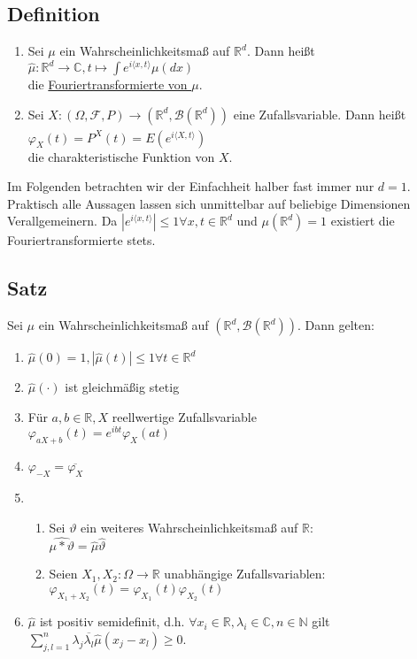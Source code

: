 \documentclass[german,10pt,oneside, fleqn, a4paper]{article}
\newcommand {\R}	{\mathbb{R}}
\newcommand {\N}	{\mathbb{N}}
\newcommand {\C}	{\mathbb{C}}
\newcommand{\ra}{\rightarrow}
\newcommand{\sm}[2][\infty]{\sum\limits_{#2}^{#1}}
\newcommand{\brc}[1]{\left(#1\right)}
\newcommand{\mc}[1]{\mathcal{#1}}
\newcommand{\1}[1]{1_{#1}}
\newcommand{\2}[1]{\1{\brac{#1}}}
\newcommand{\rbor}[1][d]{\brc{\R^{#1},\mc{B}\brc{\R^{#1}}}}
\newcommand{\raum}{\brc{\Omega,\mc{F},P}}
\begin{document}
\subsection{Definition}
\label{4.1}
\begin{enumerate}[label=(\alph*)]
\item Sei $\mu$ ein Wahrscheinlichkeitsmaß auf $\R^d$. Dann heißt \\
$\widehat\mu:\R^d\ra\C, t\mapsto\int e^{i \langle x,t\rangle}\mu(dx)$\\
die \underline{Fouriertransformierte von $\mu$}.
\item Sei $X:\raum\ra\rbor$ eine Zufallsvariable. Dann heißt \\
$\varphi_X(t)=\widehat{P^X}(t)=E(e^{i\langle X,t\rangle})$\\
die charakteristische Funktion von $X$.
\end{enumerate}
Im Folgenden betrachten wir der Einfachheit halber fast immer nur $d=1$. Praktisch alle Aussagen lassen sich unmittelbar auf beliebige Dimensionen Verallgemeinern. Da $|e ^{i\langle x,t\rangle}|\leq 1\forall x,t\in\R^d$ und $\mu(\R^d)=1$ existiert die Fouriertransformierte stets.

\subsection{Satz}
\label{4.2}
Sei $\mu$ ein Wahrscheinlichkeitsmaß auf $\rbor$. Dann gelten:
\begin{enumerate}[label=(\alph*)]
\item $\widehat\mu(0)=1, |\widehat\mu(t)|\leq 1\forall t\in\R^d$
\item $\widehat\mu(\cdot)$ ist gleichmäßig stetig
\item Für $a,b\in\R, X$ reellwertige Zufallsvariable\\
$\varphi_{aX+b}(t)=e^{ibt}\varphi_X(at)$
\item $\varphi_{-X}=\overline{\varphi_X}$
\item \begin{enumerate}[label=(\roman*)]
\item Sei $\vartheta$ ein weiteres Wahrscheinlichkeitsmaß auf $\R$:\\
$\widehat{\mu*\vartheta}=\widehat\mu \widehat\vartheta$
\item Seien $X_1, X_2:\Omega\ra\R$ unabhängige Zufallsvariablen:\\
$\varphi_{X_1+X_2}(t)=\varphi_{X_1}(t)\varphi_{X_2}(t)$
\end{enumerate}
\item $\widehat{\mu}$ ist positiv semidefinit, d.h. $\forall x_i\in\R, \lambda_i\in\C, n\in\N$ gilt \\
$\sm[n]{j,l=1} \lambda_j\overline{\lambda_l}\widehat{\mu}(x_j-x_l)\geq0$.
\end{enumerate}
\end{document}
